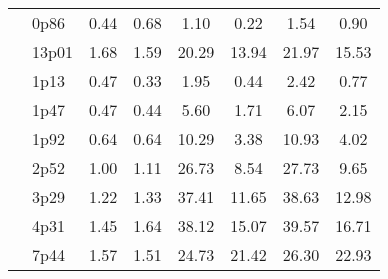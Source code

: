 \documentclass[12pt,A4paper]{article}
\begin{document}
\begin{table}[]
\begin{tabular}{llllllll}
\multicolumn{1}{|l|}{} & \multicolumn{1}{l|}{0p86} & \multicolumn{1}{c|}{0.44}        & \multicolumn{1}{c|}{0.68}         & \multicolumn{1}{c|}{1.10}        & \multicolumn{1}{c|}{0.22}         & \multicolumn{1}{c|}{1.54}        & \multicolumn{1}{c|}{0.90}         \\ \cline{2-8}
\multicolumn{1}{|l|}{} & \multicolumn{1}{l|}{13p01} & \multicolumn{1}{c|}{1.68}        & \multicolumn{1}{c|}{1.59}         & \multicolumn{1}{c|}{20.29}        & \multicolumn{1}{c|}{13.94}         & \multicolumn{1}{c|}{21.97}        & \multicolumn{1}{c|}{15.53}         \\ \cline{2-8}
\multicolumn{1}{|l|}{} & \multicolumn{1}{l|}{1p13} & \multicolumn{1}{c|}{0.47}        & \multicolumn{1}{c|}{0.33}         & \multicolumn{1}{c|}{1.95}        & \multicolumn{1}{c|}{0.44}         & \multicolumn{1}{c|}{2.42}        & \multicolumn{1}{c|}{0.77}         \\ \cline{2-8}
\multicolumn{1}{|l|}{} & \multicolumn{1}{l|}{1p47} & \multicolumn{1}{c|}{0.47}        & \multicolumn{1}{c|}{0.44}         & \multicolumn{1}{c|}{5.60}        & \multicolumn{1}{c|}{1.71}         & \multicolumn{1}{c|}{6.07}        & \multicolumn{1}{c|}{2.15}         \\ \cline{2-8}
\multicolumn{1}{|l|}{} & \multicolumn{1}{l|}{1p92} & \multicolumn{1}{c|}{0.64}        & \multicolumn{1}{c|}{0.64}         & \multicolumn{1}{c|}{10.29}        & \multicolumn{1}{c|}{3.38}         & \multicolumn{1}{c|}{10.93}        & \multicolumn{1}{c|}{4.02}         \\ \cline{2-8}
\multicolumn{1}{|l|}{} & \multicolumn{1}{l|}{2p52} & \multicolumn{1}{c|}{1.00}        & \multicolumn{1}{c|}{1.11}         & \multicolumn{1}{c|}{26.73}        & \multicolumn{1}{c|}{8.54}         & \multicolumn{1}{c|}{27.73}        & \multicolumn{1}{c|}{9.65}         \\ \cline{2-8}
\multicolumn{1}{|l|}{} & \multicolumn{1}{l|}{3p29} & \multicolumn{1}{c|}{1.22}        & \multicolumn{1}{c|}{1.33}         & \multicolumn{1}{c|}{37.41}        & \multicolumn{1}{c|}{11.65}         & \multicolumn{1}{c|}{38.63}        & \multicolumn{1}{c|}{12.98}         \\ \cline{2-8}
\multicolumn{1}{|l|}{} & \multicolumn{1}{l|}{4p31} & \multicolumn{1}{c|}{1.45}        & \multicolumn{1}{c|}{1.64}         & \multicolumn{1}{c|}{38.12}        & \multicolumn{1}{c|}{15.07}         & \multicolumn{1}{c|}{39.57}        & \multicolumn{1}{c|}{16.71}         \\ \cline{2-8}
\multicolumn{1}{|l|}{} & \multicolumn{1}{l|}{7p44} & \multicolumn{1}{c|}{1.57}        & \multicolumn{1}{c|}{1.51}         & \multicolumn{1}{c|}{24.73}        & \multicolumn{1}{c|}{21.42}         & \multicolumn{1}{c|}{26.30}        & \multicolumn{1}{c|}{22.93}         \\ \cline{2-8}

\end{tabular}
\end{table}
\end{document}
